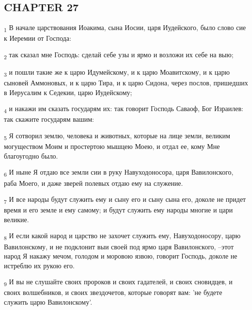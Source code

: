 \subsection{CHAPTER 27}
\begin{tcolorbox}
\textsubscript{1} В начале царствования Иоакима, сына Иосии, царя Иудейского, было слово сие к Иеремии от Господа:
\end{tcolorbox}
\begin{tcolorbox}
\textsubscript{2} так сказал мне Господь: сделай себе узы и ярмо и возложи их себе на выю;
\end{tcolorbox}
\begin{tcolorbox}
\textsubscript{3} и пошли такие же к царю Идумейскому, и к царю Моавитскому, и к царю сыновей Аммоновых, и к царю Тира, и к царю Сидона, через послов, пришедших в Иерусалим к Седекии, царю Иудейскому;
\end{tcolorbox}
\begin{tcolorbox}
\textsubscript{4} и накажи им сказать государям их: так говорит Господь Саваоф, Бог Израилев: так скажите государям вашим:
\end{tcolorbox}
\begin{tcolorbox}
\textsubscript{5} Я сотворил землю, человека и животных, которые на лице земли, великим могуществом Моим и простертою мышцею Моею, и отдал ее, кому Мне благоугодно было.
\end{tcolorbox}
\begin{tcolorbox}
\textsubscript{6} И ныне Я отдаю все земли сии в руку Навуходоносора, царя Вавилонского, раба Моего, и даже зверей полевых отдаю ему на служение.
\end{tcolorbox}
\begin{tcolorbox}
\textsubscript{7} И все народы будут служить ему и сыну его и сыну сына его, доколе не придет время и его земле и ему самому; и будут служить ему народы многие и цари великие.
\end{tcolorbox}
\begin{tcolorbox}
\textsubscript{8} И если какой народ и царство не захочет служить ему, Навуходоносору, царю Вавилонскому, и не подклонит выи своей под ярмо царя Вавилонского, --этот народ Я накажу мечом, голодом и моровою язвою, говорит Господь, доколе не истреблю их рукою его.
\end{tcolorbox}
\begin{tcolorbox}
\textsubscript{9} И вы не слушайте своих пророков и своих гадателей, и своих сновидцев, и своих волшебников, и своих звездочетов, которые говорят вам: 'не будете служить царю Вавилонскому'.
\end{tcolorbox}

